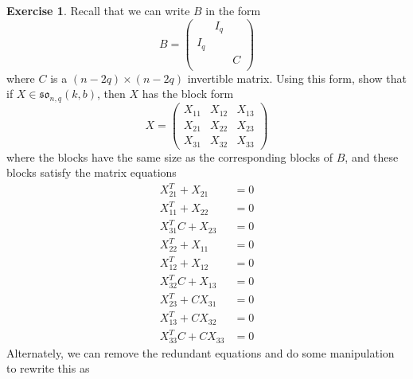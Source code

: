 \documentclass[12pt]{article}
\theoremstyle{definition}
\newtheorem{exercise}[theorem]{Exercise}
\numberwithin{theorem}{subsection}
\begin{document}
\begin{exercise}
\label{general form so Lie algebra}
Recall that we can write $B$ in the form
\[
	B = 
	\begin{pmatrix}
		& I_q \\
		I_q \\
		&& C  \\
	\end{pmatrix}
\]
where $C$ is a $(n-2q) \times (n-2q)$ invertible matrix. Using this form, show that if $X \in \mathfrak{so}_{n,q}(k,b)$, then $X$ has the block form
\[
	X =
	\begin{pmatrix}
		X_{11} & X_{12} & X_{13} \\
		X_{21} & X_{22} & X_{23} \\
		X_{31} & X_{32} & X_{33}
	\end{pmatrix}
\]
where the blocks have the same size as the corresponding blocks of $B$, and these blocks satisfy the matrix equations
\begin{align*}
	X_{21}^T + X_{21} &= 0 \\
	X_{11}^T + X_{22} &= 0 \\
	X_{31}^T C + X_{23} &= 0 \\
	X_{22}^T + X_{11} &= 0 \\
	X_{12}^T + X_{12} &= 0 \\
	X_{32}^TC + X_{13} &= 0 \\
	X_{23}^T + CX_{31} &= 0 \\
	X_{13}^T + CX_{32} &= 0 \\
	X_{33}^T C + CX_{33} &= 0
\end{align*}
Alternately, we can remove the redundant equations and do some manipulation to rewrite this as

\end{exercise}
\end{document}
